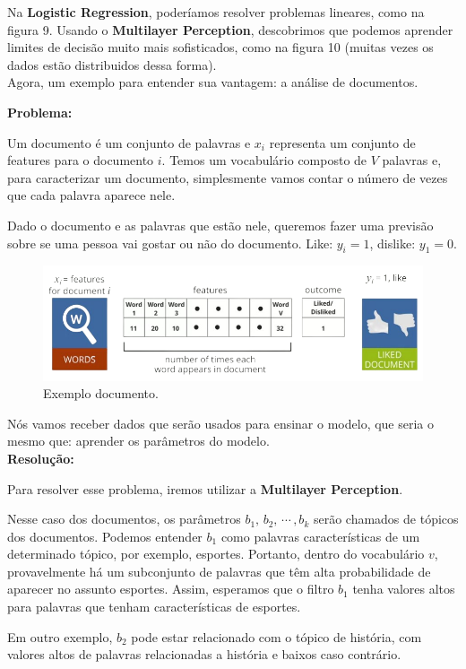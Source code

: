 \documentclass[11pt, a4paper]{article}
\begin{document}
Na \textbf{Logistic Regression}, poderíamos resolver problemas lineares, como na figura 9. Usando o \textbf{Multilayer Perception}, descobrimos que podemos aprender limites de decisão muito mais sofisticados, como na figura 10 (muitas vezes os dados estão distribuidos dessa forma).\\

Agora, um exemplo para entender sua vantagem: a análise de documentos.

\textbf{Problema:}

Um documento é um conjunto de palavras e $x_i$ representa um conjunto de features para o documento $i$. Temos um vocabulário composto de $V$ palavras e, para caracterizar um documento, simplesmente vamos contar o número de vezes que cada palavra aparece nele.

Dado o documento e as palavras que estão nele, queremos fazer uma previsão sobre se uma pessoa vai gostar ou não do documento. Like: $y_i = 1 $, dislike: $y_1 = 0$.

\begin{figure}[h]
\centering
\includegraphics[scale=0.4]{8thMTP}
\caption{Exemplo documento.}
\end{figure}

Nós vamos receber dados que serão usados para ensinar o modelo, que seria o mesmo que: aprender os parâmetros do modelo.\\

\textbf{Resolução:}

Para resolver esse problema, iremos utilizar a \textbf{Multilayer Perception}.

Nesse caso dos documentos, os parâmetros $b_1, \, b_2,\, \cdots \,, b_k$ serão chamados de tópicos dos documentos. 
Podemos entender $b_1$ como palavras características de um determinado tópico, por exemplo, esportes. Portanto, dentro do vocabulário $v$, provavelmente há um subconjunto de palavras que têm alta probabilidade de aparecer no assunto esportes. Assim, esperamos que o filtro $b_1$ tenha valores altos para palavras que tenham características de esportes.

Em outro exemplo, $b_2$ pode estar relacionado com o tópico de história, com valores altos de palavras relacionadas a história e baixos caso contrário.
\end{document}
